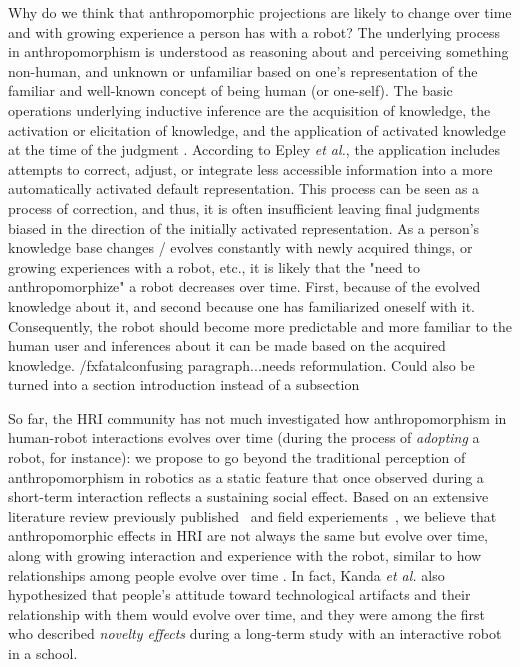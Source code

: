 \documentclass{frontiersSCNS} %
\begin{document}
Why do we think that anthropomorphic projections are likely to change over time
and with growing experience a person has with a robot? The underlying process in
anthropomorphism is understood as reasoning about and perceiving something
non-human, and unknown or unfamiliar based on one's representation of the
familiar and well-known concept of being human (or one-self). The basic
operations underlying inductive inference are the acquisition of knowledge, the
activation or elicitation of knowledge, and the application of activated
knowledge at the time of the judgment \cite{epley_when_2008}. According to Epley
\textit{et al.}, the application includes attempts to correct, adjust, or
integrate less accessible information into a more automatically activated
default representation. This process can be seen as a process of correction, and
thus, it is often insufficient leaving final judgments biased in the direction
of the initially activated representation. As a person's knowledge base changes
/ evolves constantly with newly acquired things, or growing experiences with a
robot, etc., it is likely that the "need to anthropomorphize" a robot decreases
over time. First, because of the evolved knowledge about it, and second because
one has familiarized oneself with it. Consequently, the robot should become more
predictable and more familiar to the human user and inferences about it can be
made based on the acquired knowledge.  /fxfatal{confusing paragraph...needs
reformulation. Could also be turned into a section introduction instead of a
subsection}


So far, the HRI community has not much investigated how anthropomorphism in
human-robot interactions evolves over time (during the process of
\emph{adopting} a robot, for instance): we propose to go beyond the traditional
perception of anthropomorphism in robotics as a static feature that once
observed during a short-term interaction reflects a sustaining social effect.
Based on an extensive literature review previously
published~\cite{fink_anthropomorphism_2012} and field
experiements~, we believe that anthropomorphic effects in HRI are
not always the same but evolve over time, along with growing interaction and
experience with the robot, similar to how relationships among people evolve
over time . In fact, Kanda \textit{et al.}
\cite{kanda_interactive_2004} also hypothesized that people's attitude toward
technological artifacts and their relationship with them would evolve over
time, and they were among the first who described \textit{novelty effects}
during a long-term study with an interactive robot in a school.
\end{document}
